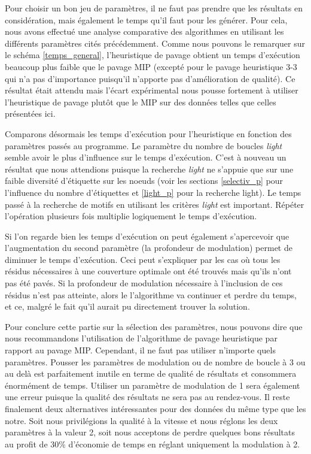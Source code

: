 Pour choisir un bon jeu de paramètres, il ne faut pas prendre que les résultats en considération, mais également le temps qu'il faut pour les générer.
Pour cela, nous avons effectué une analyse comparative des algorithmes en utilisant les différents paramètres cités précédemment.
Comme nous pouvons le remarquer sur le schéma \ref{temps_general}, l'heuristique de pavage obtient un temps d'exécution beaucoup plus faible que le pavage MIP (excepté pour le pavage heuristique 3-3 qui n'a pas d'importance puisqu'il n'apporte pas d'amélioration de qualité).
Ce résultat était attendu mais l'écart expérimental nous pousse fortement à utiliser l'heuristique de pavage plutôt que le MIP sur des données telles que celles présentées ici.

Comparons désormais les temps d'exécution pour l'heuristique en fonction des paramètres passés au programme.
Le paramètre du nombre de boucles \textit{light} semble avoir le plus d'influence sur le temps d'exécution.
C'est à nouveau un résultat que nous attendions puisque la recherche \textit{light} ne s'appuie que sur une faible diversité d'étiquette sur les noeuds (voir les sections \ref{selectiv_p} pour l'influence du nombre d'étiquettes et \ref{light_p} pour la recherche light).
Le temps passé à la recherche de motifs en utilisant les critères \textit{light} est important.
Répéter l'opération plusieurs fois multiplie logiquement le temps d'exécution.

Si l'on regarde bien les temps d'exécution on peut également s'apercevoir que l'augmentation du second paramètre (la profondeur de modulation) permet de diminuer le temps d'exécution.
Ceci peut s'expliquer par les cas où tous les résidus nécessaires à une couverture optimale ont été trouvés mais qu'ils n'ont pas été pavés.
Si la profondeur de modulation nécessaire à l'inclusion de ces résidus n'est pas atteinte, alors le l'algorithme va continuer et perdre du temps, et ce, malgré le fait qu'il aurait pu directement trouver la solution.

Pour conclure cette partie  sur la sélection des paramètres, nous pouvons dire que nous recommandons l'utilisation de l'algorithme de pavage heuristique par rapport au pavage MIP.
Cependant, il ne faut pas utiliser n'importe quels paramètres.
Pousser les paramètres de modulation ou de nombre de boucle à 3 ou au delà est parfaitement inutile en terme de qualité de résultats et consommera énormément de temps.
Utiliser un paramètre de modulation de 1 sera également une erreur puisque la qualité des résultats ne sera pas au rendez-vous.
Il reste finalement deux alternatives intéressantes pour des données du même type que les notre.
Soit nous privilégions la qualité à la vitesse et nous réglons les deux paramètres à la valeur 2, soit nous acceptons de perdre quelques bons résultats au profit de 30\% d'économie de temps en réglant uniquement la modulation à 2.





